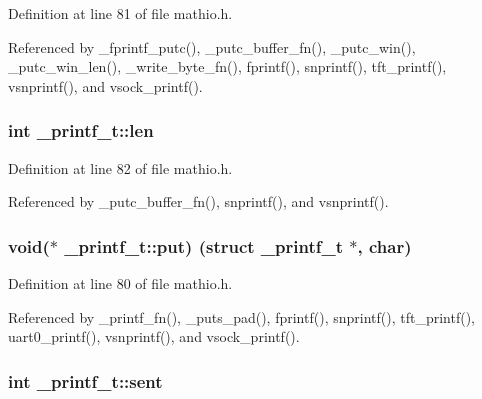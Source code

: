 Definition at line 81 of file mathio.\+h.



Referenced by \+\_\+fprintf\+\_\+putc(), \+\_\+putc\+\_\+buffer\+\_\+fn(), \+\_\+putc\+\_\+win(), \+\_\+putc\+\_\+win\+\_\+len(), \+\_\+write\+\_\+byte\+\_\+fn(), fprintf(), snprintf(), tft\+\_\+printf(), vsnprintf(), and vsock\+\_\+printf().

\subsubsection[{\texorpdfstring{len}{len}}]{\setlength{\rightskip}{0pt plus 5cm}int \+\_\+printf\+\_\+t\+::len}\hypertarget{struct__printf__t_a5139902cde74159b79e6418a34712bee}{}\label{struct__printf__t_a5139902cde74159b79e6418a34712bee}


Definition at line 82 of file mathio.\+h.



Referenced by \+\_\+putc\+\_\+buffer\+\_\+fn(), snprintf(), and vsnprintf().

\subsubsection[{\texorpdfstring{put}{put}}]{\setlength{\rightskip}{0pt plus 5cm}void($\ast$ \+\_\+printf\+\_\+t\+::put) (struct {\bf \+\_\+printf\+\_\+t} $\ast$, char)}\hypertarget{struct__printf__t_a3ef8eb0143b93d4446b04c6ce9313be7}{}\label{struct__printf__t_a3ef8eb0143b93d4446b04c6ce9313be7}


Definition at line 80 of file mathio.\+h.



Referenced by \+\_\+printf\+\_\+fn(), \+\_\+puts\+\_\+pad(), fprintf(), snprintf(), tft\+\_\+printf(), uart0\+\_\+printf(), vsnprintf(), and vsock\+\_\+printf().

\subsubsection[{\texorpdfstring{sent}{sent}}]{\setlength{\rightskip}{0pt plus 5cm}int \+\_\+printf\+\_\+t\+::sent}\hypertarget{struct__printf__t_a872716fd701166cd57bd3fffb7b77706}{}\label{struct__printf__t_a872716fd701166cd57bd3fffb7b77706}


